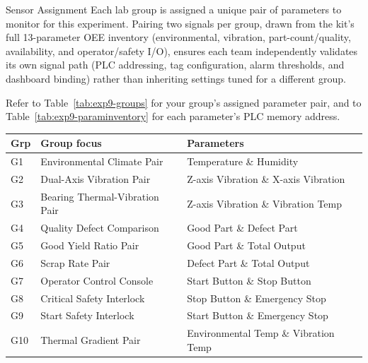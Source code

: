 \begin{labsection}{Sensor Assignment}{}
  Each lab group is assigned a unique pair of parameters to monitor for this experiment. Pairing two signals per group, drawn from the kit's full 13-parameter OEE inventory (environmental, vibration, part-count/quality, availability, and operator/safety I/O), ensures each team independently validates its own signal path (PLC addressing, tag configuration, alarm thresholds, and dashboard binding) rather than inheriting settings tuned for a different group.

  Refer to Table~\ref{tab:exp9-groups} for your group's assigned parameter pair, and to Table~\ref{tab:exp9-paraminventory} for each parameter's PLC memory address.
  \newpage

  \begin{boxedtable}
    \label{tab:exp9-groups}
    \centering
    \vspace{-4pt}
    {\renewcommand{\arraystretch}{1.3}
      \begin{tabular}{p{1.1cm}p{5.2cm}p{7.6cm}}
        \toprule
        Grp & Group focus                     & Parameters                           \\
        \midrule
        G1  & Environmental Climate Pair      & Temperature \& Humidity              \\
        G2  & Dual-Axis Vibration Pair        & Z-axis Vibration \& X-axis Vibration \\
        G3  & Bearing Thermal-Vibration Pair  & Z-axis Vibration \& Vibration Temp   \\
        G4  & Quality Defect Comparison       & Good Part \& Defect Part             \\
        G5  & Good Yield Ratio Pair           & Good Part \& Total Output            \\
        G6  & Scrap Rate Pair                 & Defect Part \& Total Output          \\
        G7  & Operator Control Console        & Start Button \& Stop Button          \\
        G8  & Critical Safety Interlock       & Stop Button \& Emergency Stop        \\
        G9  & Start Safety Interlock          & Start Button \& Emergency Stop       \\
        G10 & Thermal Gradient Pair           & Environmental Temp \& Vibration Temp \\

\end{tabular}}
\end{boxedtable}
\end{labsection}
